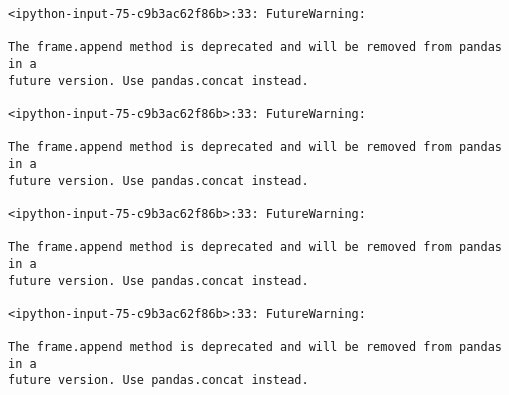 \documentclass[11pt]{article}
\begin{document}
\begin{Verbatim}[commandchars=\\\{\}]
<ipython-input-75-c9b3ac62f86b>:33: FutureWarning:

The frame.append method is deprecated and will be removed from pandas in a
future version. Use pandas.concat instead.

<ipython-input-75-c9b3ac62f86b>:33: FutureWarning:

The frame.append method is deprecated and will be removed from pandas in a
future version. Use pandas.concat instead.

<ipython-input-75-c9b3ac62f86b>:33: FutureWarning:

The frame.append method is deprecated and will be removed from pandas in a
future version. Use pandas.concat instead.

<ipython-input-75-c9b3ac62f86b>:33: FutureWarning:

The frame.append method is deprecated and will be removed from pandas in a
future version. Use pandas.concat instead.

    \end{Verbatim}
\end{document}
